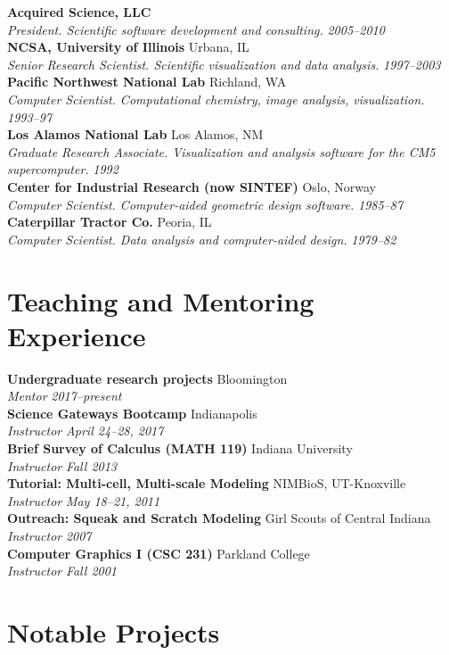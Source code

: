 \documentclass[11pt]{article}
\newcommand{\entry}[4]{%
    \noindent\textbf{#1} \hfill #2\\
    \textit{#3} \hfill \textit{#4}\\[2pt]
}
\begin{document}
\entry{Acquired Science, LLC}{}{President. Scientific software development and consulting.}{2005--2010}

\entry{NCSA, University of Illinois}{Urbana, IL}{Senior Research Scientist. Scientific visualization and data analysis.}{1997--2003}

\entry{Pacific Northwest National Lab}{Richland, WA}{Computer Scientist. Computational chemistry, image analysis, visualization.}{1993--97}

\entry{Los Alamos National Lab}{Los Alamos, NM}{Graduate Research Associate. Visualization and analysis software for the CM5 supercomputer.}{1992}

\entry{Center for Industrial Research (now SINTEF)}{Oslo, Norway}{Computer Scientist. Computer-aided geometric design software.}{1985--87}

\entry{Caterpillar Tractor Co.}{Peoria, IL}{Computer Scientist. Data analysis and computer-aided design.}{1979--82}

\section*{Teaching and Mentoring Experience}

\entry{Undergraduate research projects}{Bloomington}{Mentor}{2017--present}
\entry{Science Gateways Bootcamp}{Indianapolis}{Instructor}{April 24--28, 2017}
\entry{Brief Survey of Calculus (MATH 119)}{Indiana University}{Instructor}{Fall 2013}
\entry{Tutorial: Multi-cell, Multi-scale Modeling}{NIMBioS, UT-Knoxville}{Instructor}{May 18--21, 2011}
\entry{Outreach: Squeak and Scratch Modeling}{Girl Scouts of Central Indiana}{Instructor}{2007}
\entry{Computer Graphics I (CSC 231)}{Parkland College}{Instructor}{Fall 2001}

\section*{Notable Projects}
\end{document}
